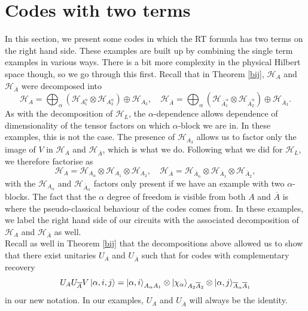 \documentclass[12pt,a4paper]{report}
\numberwithin{equation}{section}
\newcommand{\ol}[1]{\overline{#1}}
\theoremstyle{definition}
\theoremstyle{theorem}
\theoremstyle{theorem}
\theoremstyle{example}
\theoremstyle{definition}
\begin{document}
\section{Codes with two terms}
In this section, we present some codes in which the RT formula has two terms on the right hand side. These examples are built up by combining the single term examples in various ways. There is a bit more complexity in the physical Hilbert space though, so we go through this first. Recall that in Theorem \ref{bij}, $\mathcal{H}_{A}$ and $\mathcal{H}_{\ol{A}}$ were decomposed into
\begin{equation}
	\mathcal{H}_{A}=\bigoplus_{\alpha}\left(\mathcal{H}_{A_{1}^{\alpha}}\otimes\mathcal{H}_{A_{2}^{\alpha}}\right)\oplus\mathcal{H}_{A_{3}},\quad\mathcal{H}_{\ol{A}}=\bigoplus_{\alpha}\left(\mathcal{H}_{\ol{A}_{1}^{\alpha}}\otimes\mathcal{H}_{\ol{A}_{2}^{\alpha}}\right)\oplus\mathcal{H}_{\ol{A}_{3}}.
\end{equation}
As with the decomposition of $\mathcal{H}_{L}$, the $\alpha$-dependence allows dependence of dimensionality of the tensor factors on which $\alpha$-block we are in. In these examples, this is not the case. The presence of $\mathcal{H}_{A_{3}}$ allows us to factor only the image of $V$ in $\mathcal{H}_{A}$ and $\mathcal{H}_{\ol{A}}$, which is what we do. Following what we did for $\mathcal{H}_{L}$, we therefore factorise as
\begin{equation}
	\mathcal{H}_{A}=\mathcal{H}_{A_{\alpha}}\otimes\mathcal{H}_{A_{1}}\otimes\mathcal{H}_{A_{2}},\quad\mathcal{H}_{\ol{A}}=\mathcal{H}_{\ol{A}_{\alpha}}\otimes\mathcal{H}_{\ol{A}_{1}}\otimes\mathcal{H}_{\ol{A}_{2}},
\end{equation}
with the $\mathcal{H}_{A_{\alpha}}$ and $\mathcal{H}_{\ol{A}_{\alpha}}$ factors only present if we have an example with two $\alpha$-blocks. The fact that the $\alpha$ degree of freedom is visible from both $A$ and $\ol{A}$ is where the pseudo-classical behaviour of the codes comes from. In these examples, we label the right hand side of our circuits with the associated decomposition of $\mathcal{H}_{A}$ and $\mathcal{H}_{\ol{A}}$ as well.\\
Recall as well in Theorem \ref{bij} that the decompositions above allowed us to show that there exist unitaries $U_{A}$ and $U_{\ol{A}}$ such that for codes with complementary recovery
\begin{equation}\label{CR}
	U_{A}U_{\ol{A}}V\ket{\alpha,i,j}=\ket{\alpha,i}_{A_{\alpha}A_{1}}\otimes\ket{\chi_{\alpha}}_{A_{2}\ol{A}_{2}}\otimes\ket{\alpha,j}_{\ol{A}_{\alpha}\ol{A}_{1}}
\end{equation}
in our new notation. In our examples, $U_{A}$ and $U_{\ol{A}}$ will always be the identity.
\end{document}
